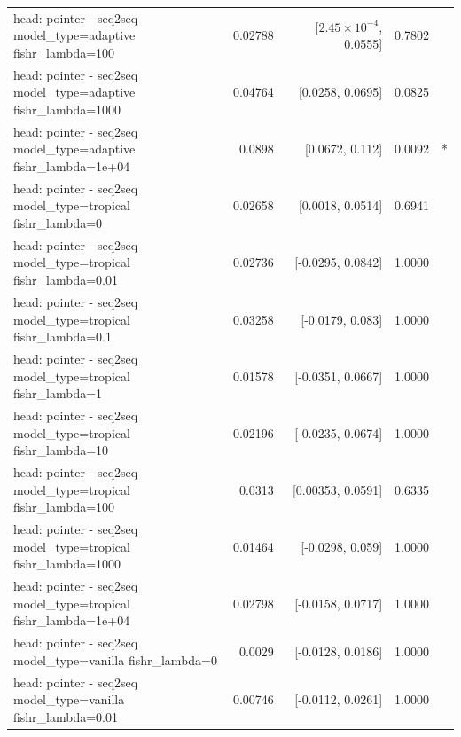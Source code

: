\documentclass[10pt]{article}
\makeatletter
\newcommand{\stackcell}[1]{\begin{tabular}[t]{@{}l@{}}#1\end{tabular}}
\makeatother
\begin{document}
{\begin{longtable}{lrrrl}
\stackcell{head: pointer - seq2seq\\\footnotesize model\_type=adaptive fishr\_lambda=100 } & 0.02788 & [$2.45\times10^{-4}$, 0.0555] & 0.7802 & \\
\stackcell{head: pointer - seq2seq\\\footnotesize model\_type=adaptive fishr\_lambda=1000 } & 0.04764 & [0.0258, 0.0695] & 0.0825 & \\
\stackcell{head: pointer - seq2seq\\\footnotesize model\_type=adaptive fishr\_lambda=1e+04 } & 0.0898 & [0.0672, 0.112] & 0.0092 & *\\
\stackcell{head: pointer - seq2seq\\\footnotesize model\_type=tropical fishr\_lambda=0 } & 0.02658 & [0.0018, 0.0514] & 0.6941 & \\
\stackcell{head: pointer - seq2seq\\\footnotesize model\_type=tropical fishr\_lambda=0.01 } & 0.02736 & [-0.0295, 0.0842] & 1.0000 & \\
\stackcell{head: pointer - seq2seq\\\footnotesize model\_type=tropical fishr\_lambda=0.1 } & 0.03258 & [-0.0179, 0.083] & 1.0000 & \\
\stackcell{head: pointer - seq2seq\\\footnotesize model\_type=tropical fishr\_lambda=1 } & 0.01578 & [-0.0351, 0.0667] & 1.0000 & \\
\stackcell{head: pointer - seq2seq\\\footnotesize model\_type=tropical fishr\_lambda=10 } & 0.02196 & [-0.0235, 0.0674] & 1.0000 & \\
\stackcell{head: pointer - seq2seq\\\footnotesize model\_type=tropical fishr\_lambda=100 } & 0.0313 & [0.00353, 0.0591] & 0.6335 & \\
\stackcell{head: pointer - seq2seq\\\footnotesize model\_type=tropical fishr\_lambda=1000 } & 0.01464 & [-0.0298, 0.059] & 1.0000 & \\
\stackcell{head: pointer - seq2seq\\\footnotesize model\_type=tropical fishr\_lambda=1e+04 } & 0.02798 & [-0.0158, 0.0717] & 1.0000 & \\
\stackcell{head: pointer - seq2seq\\\footnotesize model\_type=vanilla fishr\_lambda=0 } & 0.0029 & [-0.0128, 0.0186] & 1.0000 & \\
\stackcell{head: pointer - seq2seq\\\footnotesize model\_type=vanilla fishr\_lambda=0.01 } & 0.00746 & [-0.0112, 0.0261] & 1.0000 & \\

\end{longtable}}
\end{document}
